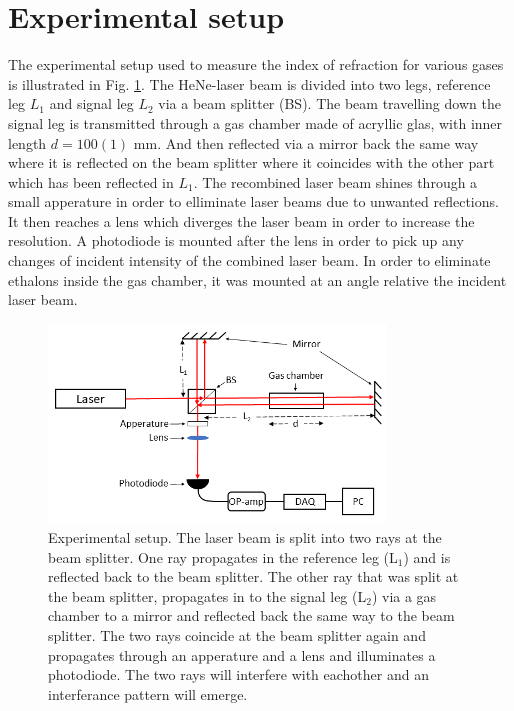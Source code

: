 \section{Experimental setup}

The experimental setup used to measure the index of refraction for various gases is illustrated in Fig. \ref{fig:experimentalSetup}. The HeNe-laser beam is divided into two legs, reference leg $L_1$ and signal leg $L_2$ via a beam splitter (BS). The beam travelling down the signal leg is transmitted through a gas chamber made of acryllic glas, with inner length $d=100(1)$ mm. And then reflected via a mirror back the same way where it is reflected on the beam splitter where it coincides with the other part which has been reflected in $L_1$. The recombined laser beam shines through a small apperature in order to elliminate laser beams due to unwanted reflections. It then reaches a lens which diverges the laser beam in order to increase the resolution. A photodiode is mounted after the lens in order to pick up any changes of incident intensity of the combined laser beam. In order to eliminate ethalons inside the gas chamber, it was mounted at an angle relative the incident laser beam.

\begin{figure}[H]
  \centering
  \includegraphics[width=0.8\textwidth]{Exp_setup.png}
  \caption{Experimental setup. The laser beam is split into two rays at the beam splitter. One ray propagates in the reference leg (L$_1$) and is reflected back to the beam splitter. The other ray that was split at the beam splitter, propagates in to the signal leg (L$_2$) via a gas chamber to a mirror and reflected back the same way to the beam splitter. The two rays coincide at the beam splitter again and propagates through an apperature and a lens and illuminates a photodiode. The two rays will interfere with eachother and an interferance pattern will emerge.}
  \label{fig:experimentalSetup}
\end{figure}

